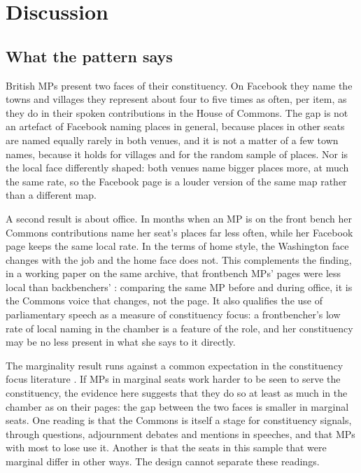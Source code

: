 \documentclass[11pt,a4paper]{article}
\begin{document}
\section{Discussion}\label{sec:disc}
\subsection{What the pattern says}
British MPs present two faces of their constituency. On Facebook they name the towns and villages they represent about four to five times as often, per item, as they do in their spoken contributions in the House of Commons. The gap is not an artefact of Facebook naming places in general, because places in other seats are named equally rarely in both venues, and it is not a matter of a few town names, because it holds for villages and for the random sample of places. Nor is the local face differently shaped: both venues name bigger places more, at much the same rate, so the Facebook page is a louder version of the same map rather than a different map.

A second result is about office. In months when an MP is on the front bench her Commons contributions name her seat's places far less often, while her Facebook page keeps the same local rate. In the terms of home style, the Washington face changes with the job and the home face does not. This complements the finding, in a working paper on the same archive, that frontbench MPs' pages were less local than backbenchers' \citep{hotham2027}: comparing the same MP before and during office, it is the Commons voice that changes, not the page. It also qualifies the use of parliamentary speech as a measure of constituency focus: a frontbencher's low rate of local naming in the chamber is a feature of the role, and her constituency may be no less present in what she says to it directly.

The marginality result runs against a common expectation in the constituency focus literature \citep{kellermann2016,andre2015}. If MPs in marginal seats work harder to be seen to serve the constituency, the evidence here suggests that they do so at least as much in the chamber as on their pages: the gap between the two faces is smaller in marginal seats. One reading is that the Commons is itself a stage for constituency signals, through questions, adjournment debates and mentions in speeches, and that MPs with most to lose use it. Another is that the seats in this sample that were marginal differ in other ways. The design cannot separate these readings.
\end{document}
